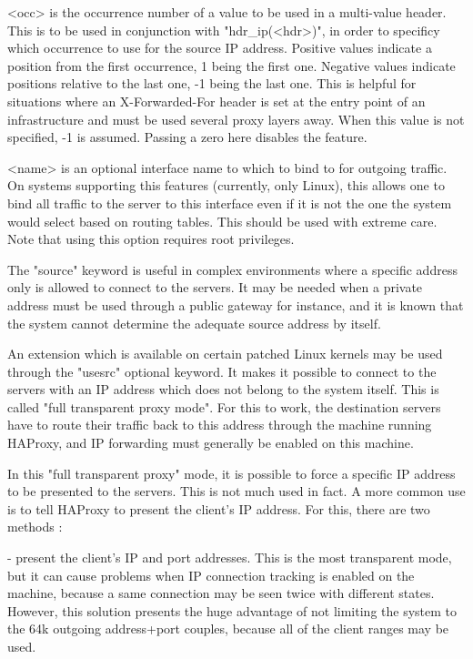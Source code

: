     <occ>     is the occurrence number of a value to be used in a multi-value
              header. This is to be used in conjunction with "hdr_ip(<hdr>)",
              in order to specificy which occurrence to use for the source IP
              address. Positive values indicate a position from the first
              occurrence, 1 being the first one. Negative values indicate
              positions relative to the last one, -1 being the last one. This
              is helpful for situations where an X-Forwarded-For header is set
              at the entry point of an infrastructure and must be used several
              proxy layers away. When this value is not specified, -1 is
              assumed. Passing a zero here disables the feature.

    <name>    is an optional interface name to which to bind to for outgoing
              traffic. On systems supporting this features (currently, only
              Linux), this allows one to bind all traffic to the server to
              this interface even if it is not the one the system would select
              based on routing tables. This should be used with extreme care.
              Note that using this option requires root privileges.

  The "source" keyword is useful in complex environments where a specific
  address only is allowed to connect to the servers. It may be needed when a
  private address must be used through a public gateway for instance, and it is
  known that the system cannot determine the adequate source address by itself.

  An extension which is available on certain patched Linux kernels may be used
  through the "usesrc" optional keyword. It makes it possible to connect to the
  servers with an IP address which does not belong to the system itself. This
  is called "full transparent proxy mode". For this to work, the destination
  servers have to route their traffic back to this address through the machine
  running HAProxy, and IP forwarding must generally be enabled on this machine.

  In this "full transparent proxy" mode, it is possible to force a specific IP
  address to be presented to the servers. This is not much used in fact. A more
  common use is to tell HAProxy to present the client's IP address. For this,
  there are two methods :

    - present the client's IP and port addresses. This is the most transparent
      mode, but it can cause problems when IP connection tracking is enabled on
      the machine, because a same connection may be seen twice with different
      states. However, this solution presents the huge advantage of not
      limiting the system to the 64k outgoing address+port couples, because all
      of the client ranges may be used.

